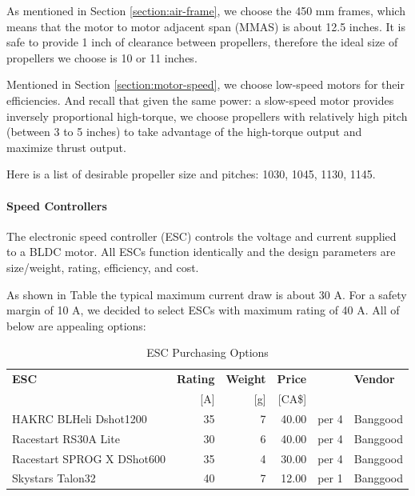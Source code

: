 As mentioned in Section \ref{section:air-frame}, we choose the 450 mm frames, which means that the motor to motor 
adjacent span (MMAS) is about 12.5 inches. It is safe to provide 1 inch of clearance between propellers, 
therefore the ideal size of propellers we choose is 10 or 11 inches.

Mentioned in  Section \ref{section:motor-speed}, we choose low-speed motors for their efficiencies. And recall that 
given the same power: a slow-speed motor provides inversely proportional high-torque, we choose propellers 
with relatively high pitch (between 3 to 5 inches) to take advantage of the high-torque output and 
maximize thrust output.

Here is a list of desirable propeller size and pitches: 1030, 1045, 1130, 1145.

\paragraph{Speed Controllers}

The electronic speed controller (ESC) controls the voltage and current supplied to a BLDC motor. All ESCs 
function identically and the design parameters are size/weight, rating, efficiency, and cost.

As shown in Table \label{table:sunnyskyx2216-table} the typical maximum current draw is about 30 A. For a 
safety margin of 10 A, we decided to select ESCs with maximum rating of 40 A. All of below are appealing 
options:

\begin{table}[H]
    \centering
    \caption{ESC Purchasing Options}
    \label{table:esc-table}

    \begin{tabular}{lrrrll}

    \hline
    \textbf{ESC} & \textbf{Rating} & \textbf{Weight} & \textbf{Price}  & & \textbf{Vendor}\\
    & [A] & [g] & [CA\$] & & \\
    \hline
    HAKRC BLHeli Dshot1200 & 35 & 7  & 40.00 & per 4 & Banggood\\
    Racestart RS30A Lite & 30 & 6  & 40.00 & per 4 & Banggood\\
    Racestart SPROG X DShot600 & 35 & 4  & 30.00 & per 4 & Banggood\\
    Skystars Talon32 & 40 & 7  & 12.00 & per 1 & Banggood\\
    \hline

    \end{tabular} 
\end{table}

